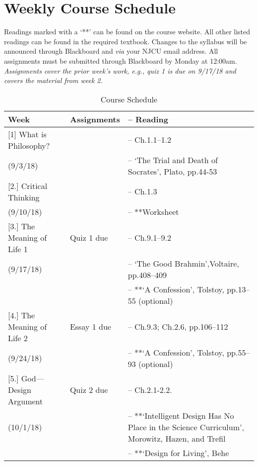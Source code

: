 \documentclass[article,oneside]{memoir}
\begin{document}
\section{Weekly Course Schedule}
Readings marked with a `**' can be found on the course website. All other listed readings can be found in the required textbook. Changes to the syllabus will be announced through Blackboard and \emph{via} your NJCU email address.  All assignments must be submitted through Blackboard by Monday at 12:00am. \emph{Assignments cover the prior week's work, e.g., quiz 1 is due on 9/17/18 and covers the material from week 2.}

\begin{center}
\begin{longtable}{p{4.5cm}p{2cm}>{-- }p{6cm}}
 
  \caption{Course Schedule} \\
  \toprule
  \textbf{Week} &\textbf{Assignments } & \textbf{Reading} \\
  \midrule

  

[1] What is Philosophy?		& 	 			& Ch.1.1--1.2  \\
(9/3/18)					&				&  `The Trial and Death of Socrates', Plato, pp.44-53   \\  [1.8\baselineskip]

[2.] Critical Thinking		 	& 				&  Ch.1.3 \\
(9/10/18)					&				&  **Worksheet \\  [1.8\baselineskip]

[3.] The Meaning of Life 1		& Quiz 1 due			&  Ch.9.1--9.2 \\
(9/17/18)					&				&  `The Good Brahmin',Voltaire, pp.408--409 \\
						&				& **`A Confession', Tolstoy, pp.13--55 (optional)\\ [1.8\baselineskip]
	
[4.] The Meaning of Life 2		& Essay 1	due		&  Ch.9.3;  Ch.2.6, pp.106--112\\
(9/24/18)					& 				&  **`A Confession', Tolstoy, pp.55--93 (optional) \\  [1.8\baselineskip]

[5.] God---Design Argument 	& Quiz 2 due		& Ch.2.1-2.2.\\ 
(10/1/18)					&				& **`Intelligent Design Has No Place in the Science Curriculum', Morowitz, Hazen, and Trefil\\
						&				& **`Design for Living', Behe\\   [1.8\baselineskip]


\end{longtable}
\end{center}
\end{document}

